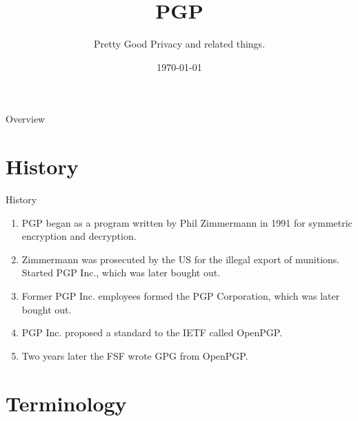 \documentclass{beamer}
\title[PGP\hspace{1em}]{PGP}
\subtitle{Pretty Good Privacy and related things.}
\date{\today}
\begin{document}
\begin{frame}
	\titlepage
\end{frame}

\begin{frame}{Overview}
	\tableofcontents
\end{frame}

\section{History}

\begin{frame}{History}
	\begin{enumerate}
		\setlength{\itemsep}{1.5em}

		\item PGP began as a program written by Phil Zimmermann in 1991
		for symmetric encryption and decryption.

		\item Zimmermann was prosecuted by the US for the illegal export
		of munitions. Started PGP Inc., which was later bought out.

		\item Former PGP Inc. employees formed the PGP Corporation,
		which was later bought out.

		\item PGP Inc. proposed a standard to the IETF called OpenPGP.

		\item Two years later the FSF wrote GPG from OpenPGP.
	\end{enumerate}
\end{frame}

\section{Terminology}
\end{document}
